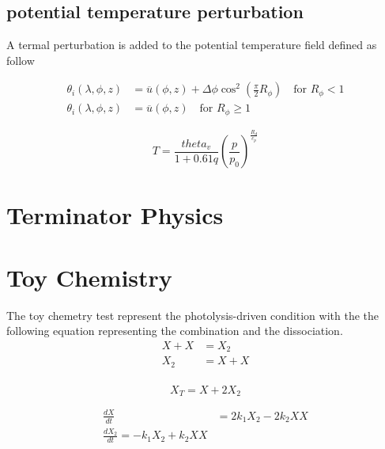 \documentclass[times,doublespace]{fldauth}
\begin{document}
\subsection{potential temperature perturbation}

A termal perturbation is added to the potential temperature field defined as follow

\begin{equation}
\begin{split}
\theta_i(\lambda,\phi,z)&=\overline{u}(\phi,z) + \Delta\phi\cos^2\left(\frac{\pi}{2}R_{\phi}\right) \text{ ~~for   } R_{\phi} < 1 \\
\theta_i(\lambda,\phi,z)&=\overline{u}(\phi,z) \text{ ~~for   } R_{\phi} \geq 1
\end{split}
\end{equation}


 \begin{equation}
T=\frac{theta_v}{1+0.61q}\left(\frac{p}{p_0}\right)^{\frac{R_d}{c_p}}
\end{equation}

\clearpage
\section{Terminator Physics}




\section{Toy Chemistry}

The toy chemetry test represent the photolysis-driven condition with the the following equation representing the combination and the dissociation.
\begin{equation}
\begin{split}
X+X&=X_2 \\
X_2&=X+X \\
\end{split}
\end{equation}

\begin{equation}
X_T=X+2X_2
\end{equation}

\begin{equation}
\begin{split}
\frac{dX}{dt}&=2k_1X_2-2k_2XX \\
\frac{dX_2}{dt}=-k_1X_2+k_2XX
\end{split}
\end{equation}
\end{document}
